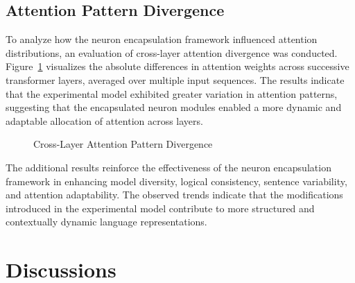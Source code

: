 \documentclass{article}
\begin{document}
\subsection{Attention Pattern Divergence}

To analyze how the neuron encapsulation framework influenced attention distributions, an evaluation of cross-layer attention divergence was conducted. Figure~\ref{fig:attention_divergence} visualizes the absolute differences in attention weights across successive transformer layers, averaged over multiple input sequences. The results indicate that the experimental model exhibited greater variation in attention patterns, suggesting that the encapsulated neuron modules enabled a more dynamic and adaptable allocation of attention across layers.

\begin{figure}[h]
	\centering
	\caption{Cross-Layer Attention Pattern Divergence}
	\label{fig:attention_divergence}
\end{figure}

The additional results reinforce the effectiveness of the neuron encapsulation framework in enhancing model diversity, logical consistency, sentence variability, and attention adaptability. The observed trends indicate that the modifications introduced in the experimental model contribute to more structured and contextually dynamic language representations.

\section{Discussions}
\end{document}
